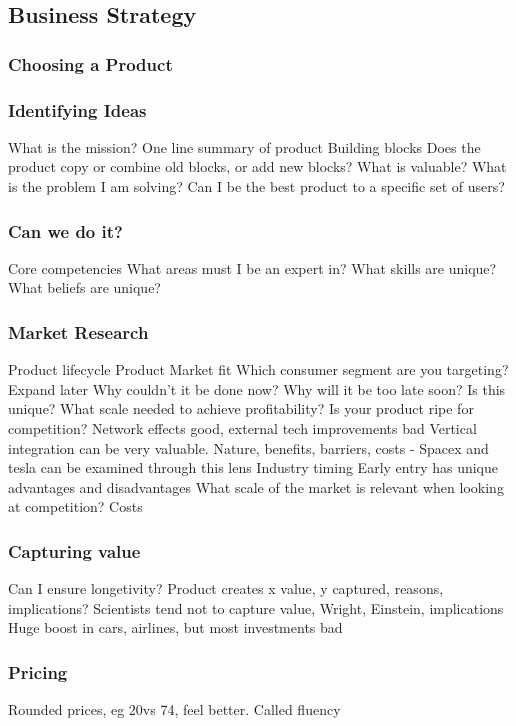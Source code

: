 \subsection{Business Strategy}
\subsubsection{Choosing a Product}
\subsubsection{Identifying Ideas}
What is the mission?
One line summary of product
Building blocks
Does the product copy or combine old blocks, or add new blocks?
What is valuable?
What is the problem I am solving?
Can I be the best product to a specific set of users?

\subsubsection{Can we do it?}
Core competencies
What areas must I be an expert in?
What skills are unique?
What beliefs are unique?

\subsubsection{Market Research}
Product lifecycle
Product Market fit
Which consumer segment are you targeting? Expand later
Why couldn't it be done now?
Why will it be too late soon?
Is this unique?
What scale needed to achieve profitability?
Is your product ripe for competition? Network effects good, external tech improvements bad
Vertical integration can be very valuable. Nature, benefits, barriers, costs
- Spacex and tesla can be examined through this lens
Industry timing
Early entry has unique advantages and disadvantages
What scale of the market is relevant when looking at competition?
Costs

\subsubsection{Capturing value}
Can I ensure longetivity?
Product creates x value, y captured, reasons, implications?
Scientists tend not to capture value, Wright, Einstein, implications
Huge boost in cars, airlines, but most investments bad
\subsubsection{Pricing}
Rounded prices, eg 20vs 74, feel better. Called fluency

